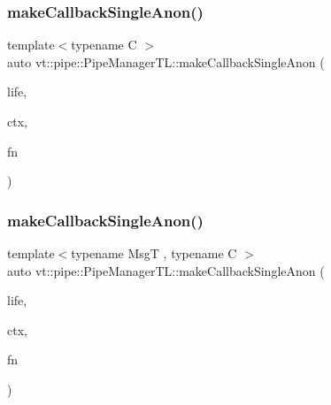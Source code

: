 \mbox{\label{structvt_1_1pipe_1_1_pipe_manager_t_l_a974ab3bbfc8a972f5d016ebf70c5a6d7}} 
\subsubsection{\texorpdfstring{make\+Callback\+Single\+Anon()}{makeCallbackSingleAnon()}\hspace{0.1cm}{\footnotesize\ttfamily [4/6]}}
{\footnotesize\ttfamily template$<$typename C $>$ \\
auto vt\+::pipe\+::\+Pipe\+Manager\+T\+L\+::make\+Callback\+Single\+Anon (\begin{DoxyParamCaption}\item[{\hyperlink{namespacevt_1_1pipe_acb42b284378c0fdac1d7c6335dc26f58}{Lifetime\+Enum}}]{life,  }\item[{C $\ast$}]{ctx,  }\item[{\hyperlink{structvt_1_1pipe_1_1_pipe_manager_base_ad8463823b6b4cfdb67c119d6d22e3bac}{Func\+Ctx\+Type}$<$ C $>$}]{fn }\end{DoxyParamCaption})}

\mbox{\label{structvt_1_1pipe_1_1_pipe_manager_t_l_ad0dca13f93e697e5c6329919ae77378f}} 
\subsubsection{\texorpdfstring{make\+Callback\+Single\+Anon()}{makeCallbackSingleAnon()}\hspace{0.1cm}{\footnotesize\ttfamily [5/6]}}
{\footnotesize\ttfamily template$<$typename MsgT , typename C $>$ \\
auto vt\+::pipe\+::\+Pipe\+Manager\+T\+L\+::make\+Callback\+Single\+Anon (\begin{DoxyParamCaption}\item[{\hyperlink{namespacevt_1_1pipe_acb42b284378c0fdac1d7c6335dc26f58}{Lifetime\+Enum}}]{life,  }\item[{C $\ast$}]{ctx,  }\item[{\hyperlink{structvt_1_1pipe_1_1_pipe_manager_base_a73fdf82ece0411b3dc644c99b763f7a9}{Func\+Msg\+Ctx\+Type}$<$ MsgT, C $>$}]{fn }\end{DoxyParamCaption})}

